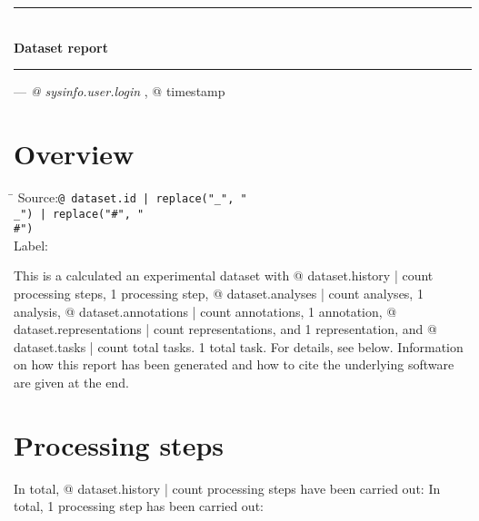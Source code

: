 

\rule[1ex]{\textwidth}{1pt}
\\[1em]
\textbf{\LARGE Dataset report}
\\[1ex]
\rule{\textwidth}{1pt}

\hfill --- \textsl{{@ sysinfo.user.login }}, {@ timestamp }

\section{Overview}

\begin{tabbing}
\hspace*{1.5cm}\=\kill
Source:\>\texttt{{@ dataset.id | replace("_", "\\_") | replace("#", "\\#") }}
\\
Label:
\end{tabbing}

This is %
a calculated %
an experimental %
dataset with
{@ dataset.history | count } processing steps,
1 processing step,
{@ dataset.analyses | count } analyses,
1 analysis,
{@ dataset.annotations | count } annotations,
1 annotation,
{@ dataset.representations | count } representations, and
1 representation, and
{@ dataset.tasks | count } total tasks.
1 total task.
For details, see below. Information on how this report has been generated and how to cite the underlying software are given at the end.

\section{Processing steps}

In total, {@ dataset.history | count } processing steps have been carried out:
In total, 1 processing step has been carried out:

